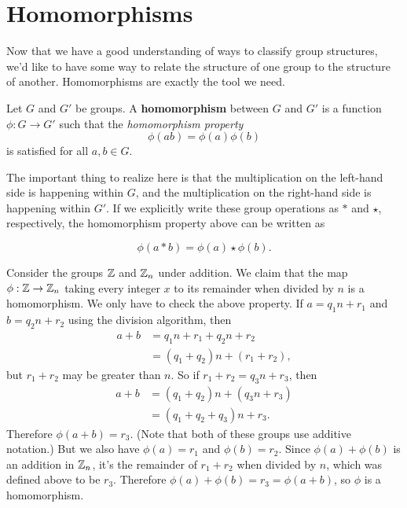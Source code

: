 \section{Homomorphisms}

Now that we have a good understanding of ways to classify group structures, we'd like to have some way to relate the structure of one group to the structure of another. Homomorphisms are exactly the tool we need. 

\begin{definition}
Let $G$ and $G'$ be groups. A \textbf{homomorphism} between $G$ and $G'$ is a function $\phi: G \to G'$ such that the \textit{homomorphism property}
\begin{equation*}
    \phi(ab) = \phi(a)\phi(b)
\end{equation*}
is satisfied for all $a, b \in G$.
\end{definition}

The important thing to realize here is that the multiplication on the left-hand side is happening within $G$, and the multiplication on the right-hand side is happening within $G'$. If we explicitly write these group operations as $*$ and $\star$, respectively, the homomorphism property above can be written as

\begin{equation*}
    \phi(a*b) = \phi(a) \star \phi(b).
\end{equation*}

\begin{example}
\label{zn_homomorphism}
Consider the groups $\z$ and $\zn[n]$ under addition. We claim that the map $\phi: \z \to \zn[n]$ taking every integer $x$ to its remainder when divided by $n$ is a homomorphism. We only have to check the above property. If $a = q_1n + r_1$ and $b = q_2n + r_2$ using the division algorithm, then
\begin{align*}
    a + b &= q_1n + r_1 + q_2n + r_2 \\
          &= (q_1 + q_2)n + (r_1 + r_2),
\end{align*}
but $r_1 + r_2$ may be greater than $n$. So if $r_1 + r_2 = q_3n + r_3$, then 
\begin{align*}
    a + b &= (q_1 + q_2)n + (q_3n + r_3)  \\
          &= (q_1 + q_2 + q_3)n + r_3.
\end{align*}
Therefore $\phi(a + b) = r_3$. (Note that both of these groups use additive notation.) But we also have $\phi(a) = r_1$ and $\phi(b) = r_2$. Since $\phi(a) + \phi(b)$ is an addition in $\zn[n]$, it's the remainder of $r_1 + r_2$ when divided by $n$, which was defined above to be $r_3$. Therefore $\phi(a) + \phi(b) = r_3 = \phi(a + b)$, so $\phi$ is a homomorphism.
\end{example}

